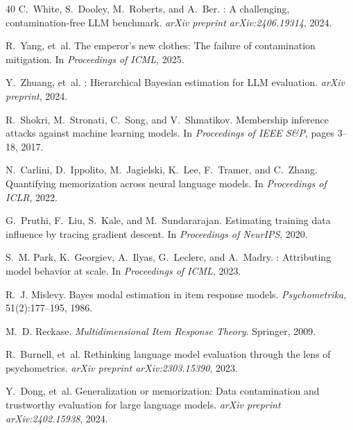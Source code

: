 \documentclass[11pt,a4paper]{article}
\begin{document}
\begin{thebibliography}{40}
C.~White, S.~Dooley, M.~Roberts, and A.~Ber.
: A challenging, contamination-free {LLM} benchmark.
\newblock \emph{arXiv preprint arXiv:2406.19314}, 2024.

R.~Yang, et~al.
\newblock The emperor's new clothes: The failure of contamination mitigation.
\newblock In \emph{Proceedings of ICML}, 2025.

Y.~Zhuang, et~al.
: Hierarchical {Bayesian} estimation for {LLM} evaluation.
\newblock \emph{arXiv preprint}, 2024.

R.~Shokri, M.~Stronati, C.~Song, and V.~Shmatikov.
\newblock Membership inference attacks against machine learning models.
\newblock In \emph{Proceedings of IEEE S\&P}, pages 3--18, 2017.

N.~Carlini, D.~Ippolito, M.~Jagielski, K.~Lee, F.~Tramer, and C.~Zhang.
\newblock Quantifying memorization across neural language models.
\newblock In \emph{Proceedings of ICLR}, 2022.

G.~Pruthi, F.~Liu, S.~Kale, and M.~Sundararajan.
\newblock Estimating training data influence by tracing gradient descent.
\newblock In \emph{Proceedings of NeurIPS}, 2020.

S.~M. Park, K.~Georgiev, A.~Ilyas, G.~Leclerc, and A.~Madry.
: Attributing model behavior at scale.
\newblock In \emph{Proceedings of ICML}, 2023.

R.~J. Mislevy.
\newblock Bayes modal estimation in item response models.
\newblock \emph{Psychometrika}, 51(2):177--195, 1986.

M.~D. Reckase.
\newblock \emph{Multidimensional Item Response Theory}.
\newblock Springer, 2009.

R.~Burnell, et~al.
\newblock Rethinking language model evaluation through the lens of psychometrics.
\newblock \emph{arXiv preprint arXiv:2303.15390}, 2023.

Y.~Dong, et~al.
\newblock Generalization or memorization: Data contamination and trustworthy evaluation for large language models.
\newblock \emph{arXiv preprint arXiv:2402.15938}, 2024.


\end{thebibliography}
\end{document}
